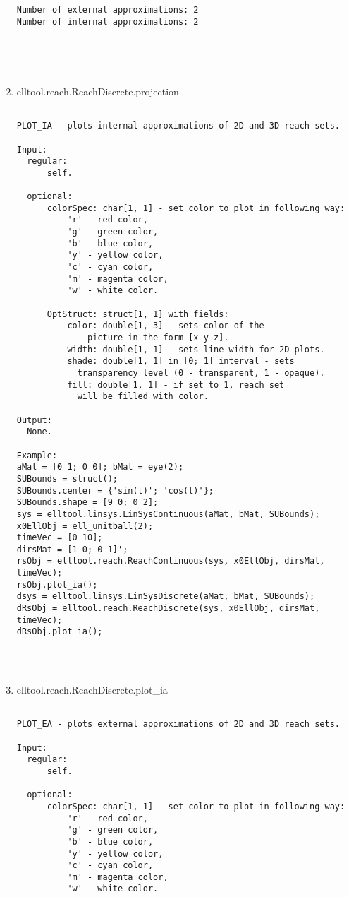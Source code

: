\begin{enumerate}
\begin{lstlisting}
Number of external approximations: 2
Number of internal approximations: 2





\end{lstlisting}
\fontfamily{\familydefault}
\selectfont
\item {elltool.reach.ReachDiscrete.projection}
\selectfont
\begin{lstlisting}

PLOT_IA - plots internal approximations of 2D and 3D reach sets.

Input:
  regular:
      self.

  optional:
      colorSpec: char[1, 1] - set color to plot in following way:
          'r' - red color,
          'g' - green color,
          'b' - blue color,
          'y' - yellow color,
          'c' - cyan color,
          'm' - magenta color,
          'w' - white color.

      OptStruct: struct[1, 1] with fields:
          color: double[1, 3] - sets color of the
              picture in the form [x y z].
          width: double[1, 1] - sets line width for 2D plots.
          shade: double[1, 1] in [0; 1] interval - sets
            transparency level (0 - transparent, 1 - opaque).
          fill: double[1, 1] - if set to 1, reach set
            will be filled with color.

Output:
  None.

Example:
aMat = [0 1; 0 0]; bMat = eye(2);
SUBounds = struct();
SUBounds.center = {'sin(t)'; 'cos(t)'};
SUBounds.shape = [9 0; 0 2];
sys = elltool.linsys.LinSysContinuous(aMat, bMat, SUBounds);
x0EllObj = ell_unitball(2);
timeVec = [0 10];
dirsMat = [1 0; 0 1]';
rsObj = elltool.reach.ReachContinuous(sys, x0EllObj, dirsMat, timeVec);
rsObj.plot_ia();
dsys = elltool.linsys.LinSysDiscrete(aMat, bMat, SUBounds);
dRsObj = elltool.reach.ReachDiscrete(sys, x0EllObj, dirsMat, timeVec);
dRsObj.plot_ia();




\end{lstlisting}
\fontfamily{\familydefault}
\selectfont
\item {elltool.reach.ReachDiscrete.plot\_ia}
\selectfont
\begin{lstlisting}

PLOT_EA - plots external approximations of 2D and 3D reach sets.

Input:
  regular:
      self.

  optional:
      colorSpec: char[1, 1] - set color to plot in following way:
          'r' - red color,
          'g' - green color,
          'b' - blue color,
          'y' - yellow color,
          'c' - cyan color,
          'm' - magenta color,
          'w' - white color.


\end{lstlisting}
\end{enumerate}
